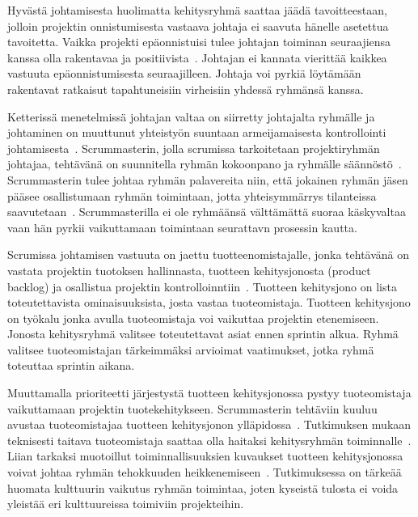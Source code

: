 \documentclass[finnish]{tktltiki2}
\theoremstyle{definition}
\theoremstyle{remark}
\begin{document}
Hyvästä johtamisesta huolimatta kehitysryhmä saattaa jäädä tavoitteestaan, jolloin projektin onnistumisesta vastaava johtaja ei saavuta hänelle asetettua tavoitetta. Vaikka projekti epäonnistuisi tulee johtajan toiminan seuraajiensa kanssa olla rakentavaa ja positiivista~\cite{raccoon2006leadership}. Johtajan ei kannata vierittää kaikkea vastuuta epäonnistumisesta seuraajilleen. Johtaja voi pyrkiä löytämään rakentavat ratkaisut tapahtuneisiin virheisiin yhdessä ryhmänsä kanssa.

Ketterissä menetelmissä johtajan valtaa on siirretty johtajalta ryhmälle ja johtaminen on muuttunut yhteistyön suuntaan armeijamaisesta kontrollointi johtamisesta~\cite{Nerur:2005:CMA:1060710.1060712}. Scrummasterin, jolla scrumissa tarkoitetaan projektiryhmän johtajaa, tehtävänä on suunnitella ryhmän kokoonpano ja ryhmälle säännöstö~\cite{4755768}. Scrummasterin tulee johtaa ryhmän palavereita niin, että jokainen ryhmän jäsen pääsee osallistumaan ryhmän toimintaan, jotta yhteisymmärrys tilanteissa saavutetaan~\cite{bradley1997effect}. Scrummasterilla ei ole ryhmäänsä välttämättä suoraa käskyvaltaa vaan hän pyrkii vaikuttamaan toimintaan seurattavn prosessin kautta.

Scrumissa johtamisen vastuuta on jaettu tuotteenomistajalle, jonka tehtävänä on vastata projektin tuotoksen hallinnasta, tuotteen kehitysjonosta (product backlog) ja osallistua projektin kontrolloinntiin~\cite{4755768}. Tuotteen kehitysjono on lista toteutettavista ominaisuuksista, josta vastaa tuoteomistaja. Tuotteen kehitysjono on työkalu jonka avulla tuoteomistaja voi vaikuttaa projektin etenemiseen. Jonosta kehitysryhmä valitsee toteutettavat asiat ennen sprintin alkua. Ryhmä valitsee tuoteomistajan tärkeimmäksi arvioimat vaatimukset, jotka ryhmä toteuttaa sprintin aikana. 

Muuttamalla prioriteetti järjestystä tuotteen kehitysjonossa pystyy tuoteomistaja vaikuttamaan projektin tuotekehitykseen. Scrummasterin tehtäviin kuuluu avustaa tuoteomistajaa tuotteen kehitysjonon ylläpidossa~\cite{Nerur:2005:CMA:1060710.1060712}. Tutkimuksen mukaan teknisesti taitava tuoteomistaja saattaa olla haitaksi kehitysryhmän toiminnalle~\cite{Nerur:2005:CMA:1060710.1060712}. Liian tarkaksi muotoillut toiminnallisuuksien kuvaukset tuotteen kehitysjonossa voivat johtaa ryhmän tehokkuuden heikkenemiseen~\cite{Nerur:2005:CMA:1060710.1060712}. Tutkimuksessa on tärkeää huomata kulttuurin vaikutus ryhmän toimintaa, joten kyseistä tulosta ei voida yleistää eri kulttuureissa toimiviin projekteihin.
\end{document}
